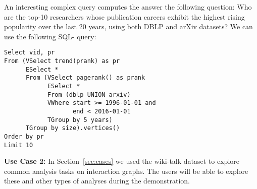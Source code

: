 An interesting complex query computes the answer the following
question: Who are the top-10 researchers whose publication careers
exhibit the highest rising popularity over the last 20 years, using
both DBLP and arXiv datasets?  We can use the following SQL-\ql
query:

\begin{small}
\begin{verbatim}
Select vid, pr
From (VSelect trend(prank) as pr
      ESelect *
      From (VSelect pagerank() as prank
            ESelect *
            From (dblp UNION arxiv)
            VWhere start >= 1996-01-01 and
                   end < 2016-01-01
            TGroup by 5 years)
      TGroup by size).vertices()
Order by pr
Limit 10
\end{verbatim}
\end{small}


{\bf Use Case 2:} In Section~\ref{sec:cases} we used the wiki-talk
dataset to explore common analysis tasks on interaction graphs.  The
users will be able to explore these and other types of analyses during
the demonstration.
